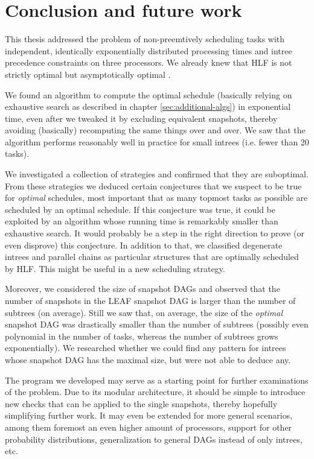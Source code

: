 
\chapter{Conclusion and future work}
\label{chap:conclusion-outlook}

This thesis addressed the problem of non-preemtively scheduling tasks with independent, identically exponentially distributed processing times and intree precedence constraints on three processors. We already knew that HLF is not strictly optimal \cite{chandyreynoldsshortpaper1975} but asymptotically optimal \cite{journals/siamcomp/PapadimitriouT87}.

We found an algorithm to compute the optimal schedule (basically relying on exhaustive search as described in chapter \ref{sec:additional-algs}) in exponential time, even after we tweaked it by excluding equivalent snapshots, thereby avoiding (basically) recomputing the same things over and over. We saw that the algorithm performs reasonably well in practice for small intrees (i.e. fewer than 20 tasks).

We investigated a collection of strategies and confirmed that they are suboptimal. From these strategies we deduced certain conjectures that we suspect to be true for \emph{optimal} schedules, most important that as many topmost tasks as possible are scheduled by an optimal schedule. If this conjecture was true, it could be exploited by an algorithm whose running time is remarkably smaller than exhaustive search. It would probably be a step in the right direction to prove (or even disprove) this conjecture. In addition to that, we classified degenerate intrees and parallel chains as particular structures that are optimally scheduled by HLF. This might be useful in a new scheduling strategy.

Moreover, we considered the size of snapshot DAGs and observed that the number of snapshots in the LEAF snapshot DAG is larger than the number of subtrees (on average). Still we saw that, on average, the size of the \emph{optimal} snapshot DAG was drastically smaller than the number of subtrees (possibly even polynomial in the number of tasks, whereas the number of subtrees grows exponentially). We researched whether we could find any pattern for intrees whose snapshot DAG has the maximal size, but were not able to deduce any.

The program we developed may serve as a starting point for further examinations of the problem. Due to its modular architecture, it should be simple to introduce new checks that can be applied to the single snapshots, thereby hopefully simplifying further work. It may even be extended for more general scenarios, among them foremost an even higher amount of processors, support for other probability distributions, generalization to general DAGs instead of only intrees, etc.

